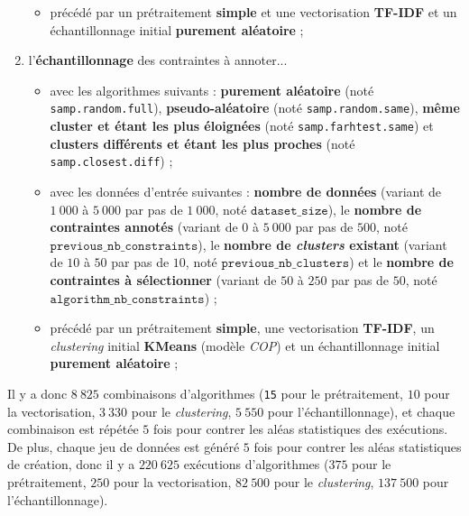 \begin{enumerate}
\begin{itemize}
						\item précédé par un prétraitement \textbf{simple} et une vectorisation \textbf{TF-IDF} et un échantillonnage initial \textbf{purement aléatoire} ;
					\end{itemize}
				\item l'\textbf{échantillonnage} des contraintes à annoter...
					\begin{itemize}
						\item avec les algorithmes suivants : \textbf{purement aléatoire} (noté \texttt{samp.random.full}), \textbf{pseudo-aléatoire} (noté \texttt{samp.random.same}), \textbf{même cluster et étant les plus éloignées} (noté \texttt{samp.farhtest.same}) et \textbf{clusters différents et étant les plus proches} (noté \texttt{samp.closest.diff}) ;
						\item avec les données d'entrée suivantes : \textbf{nombre de données} (variant de $1~000$ à $5~000$ par pas de $1~000$, noté $\texttt{dataset\_size}$), le \textbf{nombre de contraintes annotés} (variant de $0$ à $5~000$ par pas de $500$, noté $\texttt{previous\_nb\_constraints}$), le \textbf{nombre de \textit{clusters} existant} (variant de $10$ à $50$ par pas de $10$, noté $\texttt{previous\_nb\_clusters}$) et le \textbf{nombre de contraintes à sélectionner} (variant de $50$ à $250$ par pas de $50$, noté $\texttt{algorithm\_nb\_constraints}$) ;
						\item précédé par un prétraitement \textbf{simple}, une vectorisation \textbf{TF-IDF}, un \textit{clustering} initial \textbf{KMeans} (modèle \textit{COP}) et un échantillonnage initial \textbf{purement aléatoire} ;
					\end{itemize}
			\end{enumerate}
			
			Il y a donc $8~825$ combinaisons d'algorithmes (\texttt{15} pour le prétraitement, $10$ pour la vectorisation, $3~330$ pour le \textit{clustering}, $5~550$ pour l'échantillonnage), et chaque combinaison est répétée $5$ fois pour contrer les aléas statistiques des exécutions.
			De plus, chaque jeu de données est généré $5$ fois pour contrer les aléas statistiques de création, donc il y a $220~625$ exécutions d'algorithmes ($375$ pour le prétraitement, $250$ pour la vectorisation, $82~500$ pour le \textit{clustering}, $137~500$ pour l'échantillonnage).
			
